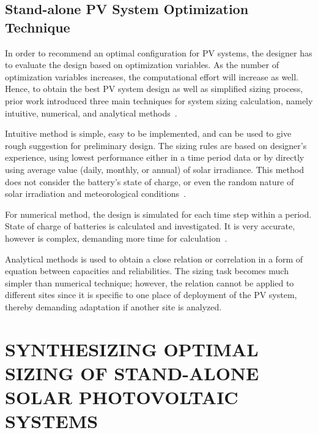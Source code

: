 \documentclass[review]{elsarticle}
\begin{document}
\subsection{Stand-alone PV System Optimization Technique}

In order to recommend an optimal configuration for PV systems, 
the designer has to evaluate the design based on optimization variables. 
As the number of optimization variables increases, the computational effort 
will increase as well. Hence, to obtain the best PV system design as well as 
simplified sizing process, prior work introduced three main techniques 
for system sizing calculation, namely intuitive, numerical, and analytical methods~\cite{Zhou2010}.

Intuitive method is simple, easy to be implemented, and can be used to give 
rough suggestion for preliminary design. The sizing rules are based on designer's experience, 
using lowest performance either in a time period data or by directly using average value 
(daily, monthly, or annual) of solar irradiance. This method does not consider the battery's 
state of charge, or even the random nature of solar irradiation and meteorological conditions~\cite{Alsadi2018}.

For numerical method, the design is simulated for each time step within a period. 
State of charge of batteries is calculated and investigated. It is very accurate, 
however is complex, demanding more time for calculation~\cite{Park2004}.

Analytical methods is used to obtain a close relation or correlation in a form 
of equation between capacities and reliabilities. The sizing task becomes much simpler 
than numerical technique; however, the relation cannot be applied to different sites
since it is specific to one place of deployment of the PV system, 
thereby demanding adaptation if another site is analyzed.

\section{SYNTHESIZING OPTIMAL SIZING OF STAND-ALONE SOLAR PHOTOVOLTAIC SYSTEMS}
\label{sec:Method}
\end{document}
